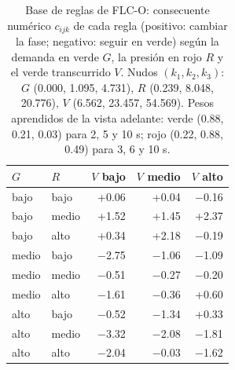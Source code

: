 \begin{table}[t]
\centering
\caption{Base de reglas de FLC-O: consecuente num\'erico $c_{ijk}$ de cada regla (positivo: cambiar la fase; negativo: seguir en verde) seg\'un la demanda en verde $G$, la presi\'on en rojo $R$ y el verde transcurrido $V$. Nudos $(k_1,k_2,k_3)$: $G$ (0.000, 1.095, 4.731), $R$ (0.239, 8.048, 20.776), $V$ (6.562, 23.457, 54.569). Pesos aprendidos de la vista adelante: verde (0.88, 0.21, 0.03) para 2, 5 y 10 s; rojo (0.22, 0.88, 0.49) para 3, 6 y 10 s.}
\label{tab:reglasflc}
\scriptsize
\begin{tabular}{@{}llrrr@{}}
\toprule
$G$ & $R$ & $V$ bajo & $V$ medio & $V$ alto \\
\midrule
bajo & bajo & +0.06 & +0.04 & $-$0.16 \\
bajo & medio & +1.52 & +1.45 & +2.37 \\
bajo & alto & +0.34 & +2.18 & $-$0.19 \\
medio & bajo & $-$2.75 & $-$1.06 & $-$1.09 \\
medio & medio & $-$0.51 & $-$0.27 & $-$0.20 \\
medio & alto & $-$1.61 & $-$0.36 & +0.60 \\
alto & bajo & $-$0.52 & $-$1.34 & +0.33 \\
alto & medio & $-$3.32 & $-$2.08 & $-$1.81 \\
alto & alto & $-$2.04 & $-$0.03 & $-$1.62 \\
\bottomrule
\end{tabular}
\end{table}
